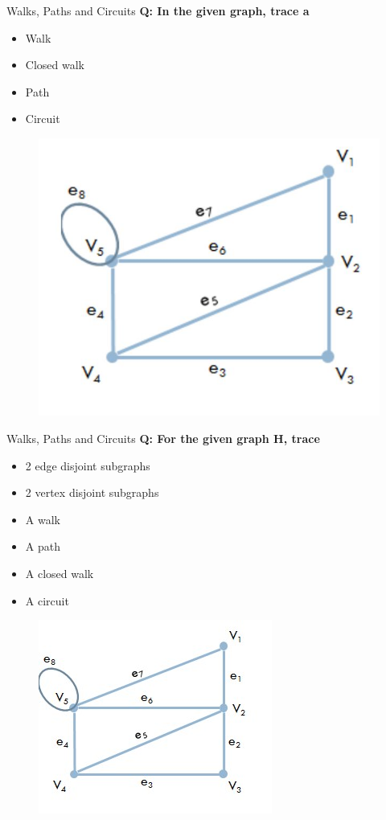 \documentclass{beamer}
\begin{document}
\begin{frame}{Walks, Paths and Circuits}
	\textbf{Q: In the given graph, trace a}
	\begin{itemize}
		\item Walk
		\item Closed walk         
		\item Path
		\item Circuit 
	\end{itemize}
	
	\begin{figure}
		\includegraphics[scale=.4]{img/m32}
	\end{figure}
\end{frame}
\begin{frame}{Walks, Paths and Circuits}
	\textbf{Q: For the given graph H, trace}
	\begin{itemize}
		\item 2 edge disjoint subgraphs
		\item 2 vertex disjoint subgraphs
		\item A walk
		\item A path
		\item A closed walk
		\item A circuit
	\end{itemize}
	
	\begin{figure}
		\includegraphics[scale=.6]{img/m33}
	\end{figure}
\end{frame}
\end{document}
